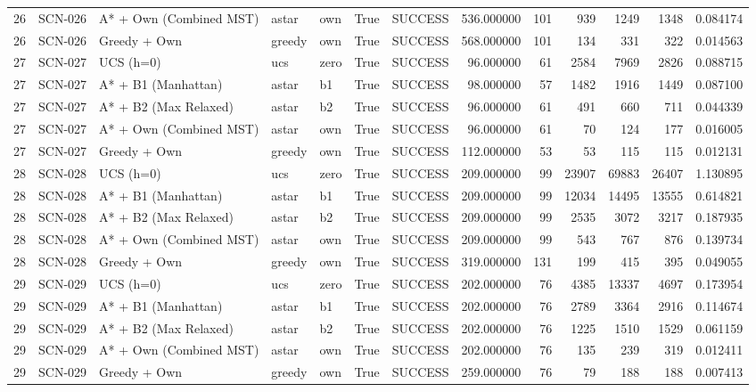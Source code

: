 \begin{table}[htbp]
\begin{tabular}{rllllrlrrrrrr}
26 & SCN-026 & A* + Own (Combined MST) & astar & own & True & SUCCESS & 536.000000 & 101 & 939 & 1249 & 1348 & 0.084174 \\
26 & SCN-026 & Greedy + Own & greedy & own & True & SUCCESS & 568.000000 & 101 & 134 & 331 & 322 & 0.014563 \\
27 & SCN-027 & UCS (h=0) & ucs & zero & True & SUCCESS & 96.000000 & 61 & 2584 & 7969 & 2826 & 0.088715 \\
27 & SCN-027 & A* + B1 (Manhattan) & astar & b1 & True & SUCCESS & 98.000000 & 57 & 1482 & 1916 & 1449 & 0.087100 \\
27 & SCN-027 & A* + B2 (Max Relaxed) & astar & b2 & True & SUCCESS & 96.000000 & 61 & 491 & 660 & 711 & 0.044339 \\
27 & SCN-027 & A* + Own (Combined MST) & astar & own & True & SUCCESS & 96.000000 & 61 & 70 & 124 & 177 & 0.016005 \\
27 & SCN-027 & Greedy + Own & greedy & own & True & SUCCESS & 112.000000 & 53 & 53 & 115 & 115 & 0.012131 \\
28 & SCN-028 & UCS (h=0) & ucs & zero & True & SUCCESS & 209.000000 & 99 & 23907 & 69883 & 26407 & 1.130895 \\
28 & SCN-028 & A* + B1 (Manhattan) & astar & b1 & True & SUCCESS & 209.000000 & 99 & 12034 & 14495 & 13555 & 0.614821 \\
28 & SCN-028 & A* + B2 (Max Relaxed) & astar & b2 & True & SUCCESS & 209.000000 & 99 & 2535 & 3072 & 3217 & 0.187935 \\
28 & SCN-028 & A* + Own (Combined MST) & astar & own & True & SUCCESS & 209.000000 & 99 & 543 & 767 & 876 & 0.139734 \\
28 & SCN-028 & Greedy + Own & greedy & own & True & SUCCESS & 319.000000 & 131 & 199 & 415 & 395 & 0.049055 \\
29 & SCN-029 & UCS (h=0) & ucs & zero & True & SUCCESS & 202.000000 & 76 & 4385 & 13337 & 4697 & 0.173954 \\
29 & SCN-029 & A* + B1 (Manhattan) & astar & b1 & True & SUCCESS & 202.000000 & 76 & 2789 & 3364 & 2916 & 0.114674 \\
29 & SCN-029 & A* + B2 (Max Relaxed) & astar & b2 & True & SUCCESS & 202.000000 & 76 & 1225 & 1510 & 1529 & 0.061159 \\
29 & SCN-029 & A* + Own (Combined MST) & astar & own & True & SUCCESS & 202.000000 & 76 & 135 & 239 & 319 & 0.012411 \\
29 & SCN-029 & Greedy + Own & greedy & own & True & SUCCESS & 259.000000 & 76 & 79 & 188 & 188 & 0.007413 \\
\bottomrule
\end{tabular}

\end{table}
